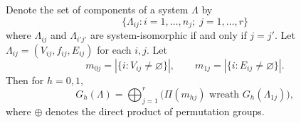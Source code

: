 Denote the set of components of a system $\Lambda$ by
$$\{\Lambda_{ij} : i = 1, \ldots, n_j; \; j = 1, \ldots, r\}$$
where $\Lambda_{ij}$ and $\Lambda_{i'j'}$ are system-isomorphic if and only if $j = j'$. Let $\Lambda_{ij} = (V_{ij}, f_{ij}, E_{ij})$ for each $i, j$. Let
$$m_{0j} = |\{i : V_{ij} \neq \varnothing\}|, \qquad m_{1j} = |\{i : E_{ij} \neq \varnothing\}|.$$
Then for $h = 0, 1$,
$$G_h(\Lambda) = \bigoplus_{j=1}^{r} \bigl( \Pi(m_{hj}) \text{ wreath } G_h(\Lambda_{1j}) \bigr),$$
where $\oplus$ denotes the direct product of permutation groups.
